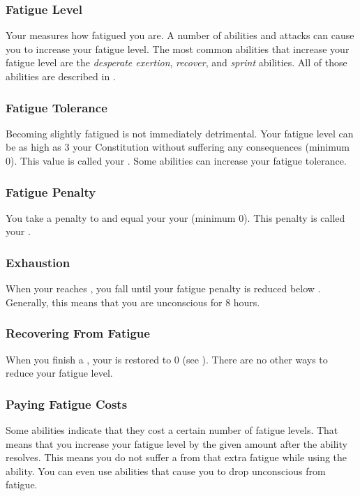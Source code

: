     \subsubsection{Fatigue Level}\label{Fatigue Level}
      Your  measures how fatigued you are.
      A number of abilities and attacks can cause you to increase your fatigue level.
      The most common abilities that increase your fatigue level are the \textit{desperate exertion}, \textit{recover}, and \textit{sprint} abilities.
      All of those abilities are described in .

    \subsubsection{Fatigue Tolerance}\label{Fatigue Tolerance}
      Becoming slightly fatigued is not immediately detrimental.
      Your fatigue level can be as high as 3 \add your Constitution without suffering any consequences (minimum 0).
      This value is called your .
      Some abilities can increase your fatigue tolerance.

    \subsubsection{Fatigue Penalty}\label{Fatigue Penalty}
      You take a penalty to  and  equal your  \sub your  (minimum 0).
      This penalty is called your .

    \subsubsection{Exhaustion}\label{Exhaustion}
      When your  reaches , you fall \unconscious until your fatigue penalty is reduced below .
      Generally, this means that you are unconscious for 8 hours.

    \subsubsection{Recovering From Fatigue}
      When you finish a , your  is restored to 0 (see ).
      There are no other ways to reduce your fatigue level.

    \subsubsection{Paying Fatigue Costs}
      Some abilities indicate that they cost a certain number of fatigue levels.
      That means that you increase your fatigue level by the given amount after the ability resolves.
      This means you do not suffer a  from that extra fatigue while using the ability.
      You can even use abilities that cause you to drop unconscious from fatigue.

